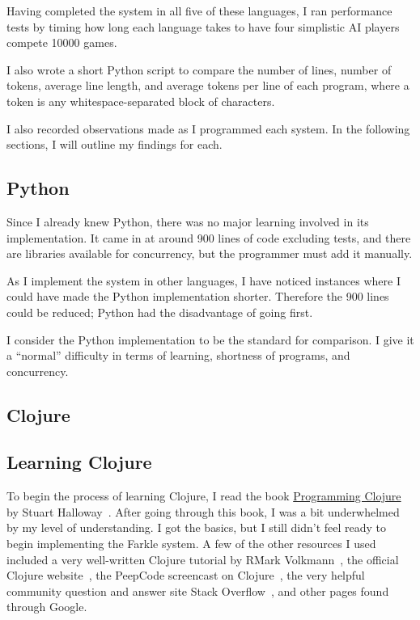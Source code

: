 \documentclass{article}
\begin{document}
Having completed the system in all five of these languages, I ran performance
tests by timing how long each language takes to have four simplistic AI players
compete 10000 games.

I also wrote a short Python script to compare the number of lines, number of
tokens, average line length, and average tokens per line of each program, where
a token is any whitespace-separated block of characters.

I also recorded observations made as I programmed each system.  In the following
sections, I will outline my findings for each.

\subsection{Python}

Since I already knew Python, there was no major learning involved in its
implementation.  It came in at around 900 lines of code excluding tests, and
there are libraries available for concurrency, but the programmer must add it
manually.

As I implement the system in other languages, I have noticed instances where I
could have made the Python implementation shorter.  Therefore the 900 lines
could be reduced; Python had the disadvantage of going first.

I consider the Python implementation to be the standard for comparison.  I give
it a ``normal'' difficulty in terms of learning, shortness of programs, and
concurrency.

\subsection{Clojure}

\subsection{Learning Clojure}

To begin the process of learning Clojure, I read the book \underline{Programming
Clojure} by Stuart Halloway~\cite{clojurebook}.  After going through this book,
I was a bit underwhelmed by my level of understanding.  I got the basics, but I
still didn't feel ready to begin implementing the Farkle system.  A few of the
other resources I used included a very well-written Clojure tutorial by R\. Mark
Volkmann~\cite{clojuretutorial}, the official Clojure
website~\cite{clojuredotorg}, the PeepCode screencast on
Clojure~\cite{peepcodeclojure}, the very helpful community question and answer
site Stack Overflow~\cite{stackoverflow}, and other pages found through Google.
\end{document}
